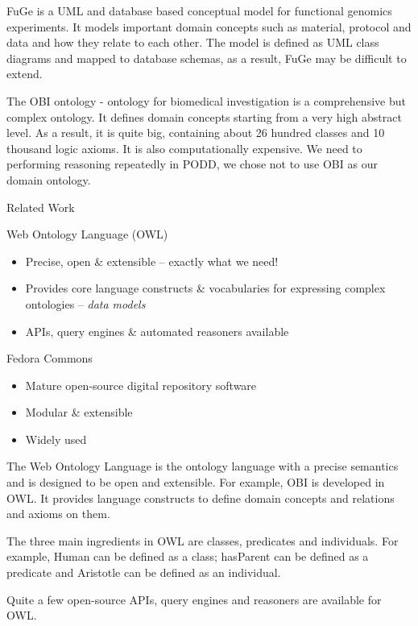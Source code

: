 \documentclass[ignorenonframetext,compress]{beamer}
\begin{document}
FuGe is a UML and database based conceptual model for functional
genomics experiments. It models important domain concepts such as
material, protocol and data and how they relate to each other. 
The model is defined as UML class diagrams and mapped to database 
schemas, as a result, FuGe may be difficult to extend.

The OBI ontology - ontology for biomedical investigation is a
comprehensive but complex ontology. It defines domain concepts 
starting from a very high abstract level. As a result, it is quite 
big, containing about 26 hundred classes and 10 thousand logic
axioms. It is also computationally expensive. We need to performing 
reasoning repeatedly in PODD, we chose not to use OBI as our domain 
ontology. 

\begin{frame}{Related Work}
\begin{block}{Web Ontology Language (OWL)}
\begin{itemize}
    \item Precise, open \& extensible -- exactly what we need!
    \item Provides core language constructs \& vocabularies for expressing complex ontologies -- \emph{data models}
    \item APIs, query engines \& automated reasoners available
\end{itemize}
\end{block}
\begin{block}{Fedora Commons}
\begin{itemize}
	\item Mature open-source digital repository software
	\item Modular \& extensible
	\item Widely used 
\end{itemize}
\end{block}
\end{frame}

The Web Ontology Language is the ontology language with a precise semantics 
and is designed to be open and extensible. For example, OBI is developed
in OWL. It provides language constructs to define domain concepts and relations
and axioms on them. 

The three main ingredients in OWL are classes, predicates and individuals. 
For example, Human can be defined as a class; hasParent can be defined as
a predicate and Aristotle can be defined as an individual. 

Quite a few open-source APIs, query engines and reasoners are available for OWL. 
\end{document}
